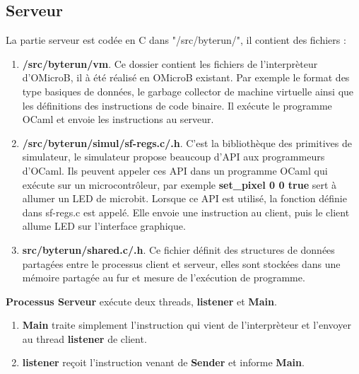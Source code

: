 \documentclass[14px]{article}
\begin{document}
	\subsection{Serveur}
	La partie serveur est codée en C dans "/src/byterun/", il contient des fichiers :
	\begin{enumerate}
		\item \textbf{/src/byterun/vm}.
		Ce dossier contient les fichiers de l'interprèteur d'OMicroB, il à été réalisé en OMicroB existant. Par exemple le format des type basiques de données, le garbage collector de machine virtuelle ainsi que les définitions des instructions de code binaire. Il exécute le programme OCaml et envoie les instructions au serveur.
		
		\item \textbf{/src/byterun/simul/sf-regs.c/.h}.
		C'est la bibliothèque des primitives de simulateur, le simulateur propose beaucoup d'API aux programmeurs d'OCaml. Ils peuvent appeler ces API dans un programme OCaml qui exécute sur un microcontrôleur, par exemple \textbf{set\_pixel 0 0 true} sert à allumer un LED de microbit. Lorsque ce API est utilisé, la fonction définie dans sf-regs.c est appelé. Elle envoie une instruction au client, puis le client allume LED sur l'interface graphique.
		
		\item \textbf{src/byterun/shared.c/.h}.
		Ce fichier définit des structures de données partagées entre le processus client et serveur, elles sont stockées dans une mémoire partagée au fur et mesure de l'exécution de programme.
	\end{enumerate}
	\textbf{Processus Serveur} exécute deux threads, \textbf{listener} et \textbf{Main}.
	\begin{enumerate}
		\item \textbf{Main} traite simplement l'instruction qui vient de l'interprèteur et l'envoyer au thread \textbf{listener} de client.
		\item \textbf{listener} reçoit l'instruction venant de \textbf{Sender} et informe \textbf{Main}.
	\end{enumerate}
	
\end{document}
